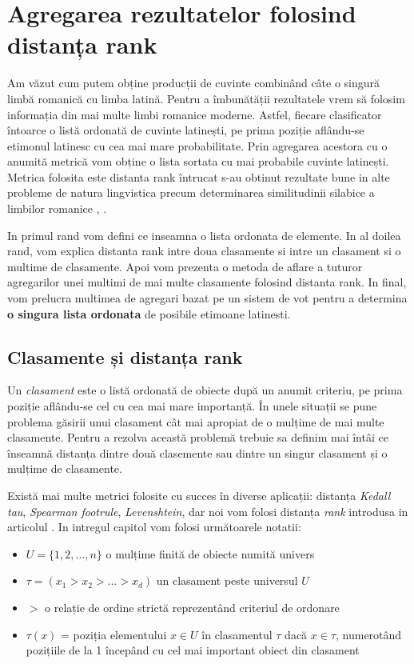 \chapter{Agregarea rezultatelor folosind distanța rank}
\label{chap:three}
Am văzut cum putem obține producții de cuvinte combinând câte o singură limbă romanică cu 
limba latină. Pentru a îmbunătății rezultatele vrem să folosim informația din mai multe 
limbi romanice moderne. Astfel, fiecare clasificator întoarce o listă ordonată de cuvinte latinești, 
pe prima poziție aflându-se etimonul latinesc cu cea mai mare probabilitate. Prin agregarea 
acestora cu o anumită metrică vom obține o lista sortata cu mai probabile cuvinte latinești. Metrica
folosita este distanta rank \cite{rankdistance} întrucat s-au obtinut rezultate bune in alte 
probleme de natura lingvistica precum determinarea similitudinii silabice a limbilor romanice 
\cite{syllabicsim}, \cite{simnat}.

In primul rand vom defini ce inseamna o lista ordonata de elemente. In al doilea rand, vom explica
distanta rank intre doua clasamente si intre un clasament si o multime de clasamente. Apoi vom
prezenta o metoda de aflare a tuturor agregarilor unei multimi de mai multe clasamente folosind
distanta rank. In final, vom prelucra multimea de agregari bazat pe un sistem de vot pentru a 
determina \textbf{o singura lista ordonata} de posibile etimoane latinesti.

\section{Clasamente și distanța rank}
Un \textit{clasament} este o listă ordonată de obiecte după un anumit criteriu, pe prima poziție 
aflându-se cel cu cea mai mare importanță. În unele situații se pune problema găsirii unui clasament
cât mai apropiat de o mulțime de mai multe clasamente. Pentru a rezolva această problemă trebuie sa
definim mai întâi ce înseamnă distanța dintre două clasemente sau dintre un singur clasament și o
mulțime de clasamente.

Există mai multe metrici folosite cu succes în diverse aplicații: distanța \textit{Kedall tau}, 
\textit{Spearman footrule}, \textit{Levenshtein}, dar noi vom folosi distanța \textit{rank}
introdusa in articolul \cite{rankdistance}. In intregul capitol vom folosi următoarele notatii:
\begin{itemize}
    \item $U = \{1, 2, ..., n\}$ o mulțime finită de obiecte numită univers 
    \item $\tau = (x_1 > x_2 > ... > x_d)$ un clasament peste universul $U$ 
    \item $>$ o relație de ordine strictă reprezentând criteriul de ordonare 
    \item $\tau(x)$ = poziția elementului $x \in U$ în clasamentul $\tau$ dacă $x \in \tau$, 
      numerotând pozițiile de la 1 începând cu cel mai important obiect din clasament
\end{itemize}

